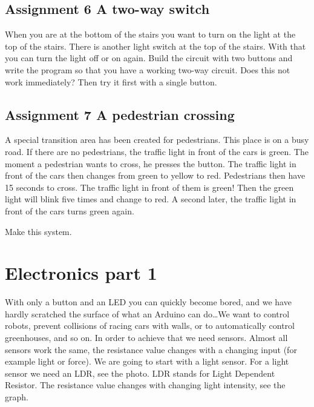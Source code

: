 \documentclass{arduino}
\begin{document}
\subsection{Assignment 6 A two-way switch}

When you are at the bottom of the stairs you want to turn on the light at the top of the stairs. There is another light switch at the top of the stairs. With that you can turn the light off or on again. Build the circuit with two buttons and write the program so that you have a working two-way circuit. Does this not work immediately? Then try it first with a single button.

\subsection{Assignment 7 A pedestrian crossing}

A special transition area has been created for pedestrians. This place is on a busy road. If there are no pedestrians, the traffic light in front of the cars is green. The moment a pedestrian wants to cross, he presses the button. The traffic light in front of the cars then changes from green to yellow to red. Pedestrians then have 15 seconds to cross. The traffic light in front of them is green! Then the green light will blink five times and change to red. A second later, the traffic light in front of the cars turns green again.

Make this system.

\newpage

\section{Electronics part 1}



With only a button and an LED you can quickly become bored, and we have hardly scratched the surface of what an Arduino can do\dots We want to control robots, prevent collisions of racing cars with walls, or to automatically control greenhouses, and so on. In order to achieve that we need sensors. Almost all sensors work the same, the resistance value changes with a changing input (for example light or force). We are going to start with a light sensor. For a light sensor we need an LDR, see the photo. LDR stands for Light Dependent Resistor. The resistance value changes with changing light intensity, see the graph.
\end{document}
